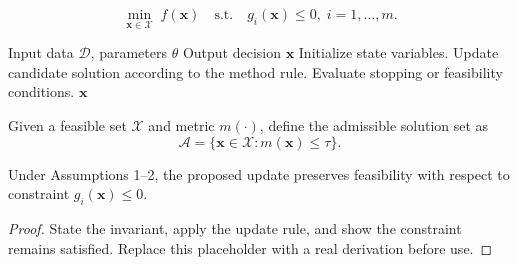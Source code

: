 
\begin{equation}
  \min_{\mathbf{x} \in \mathcal{X}} \; f(\mathbf{x})
  \quad \text{s.t.} \quad
  g_i(\mathbf{x}) \le 0,\; i=1,\ldots,m .
\end{equation}

\begin{algorithm}[t]
\caption{Method Name}
\label{alg:method-name}
\begin{algorithmic}[1]
\Require Input data $\mathcal{D}$, parameters $\theta$
\Ensure Output decision $\mathbf{x}$
\State Initialize state variables.
  \State Update candidate solution according to the method rule.
  \State Evaluate stopping or feasibility conditions.
\EndFor
\State \Return $\mathbf{x}$
\end{algorithmic}
\end{algorithm}

\begin{definition}
Given a feasible set $\mathcal{X}$ and metric $m(\cdot)$, define the admissible solution set as
\[
  \mathcal{A} = \{\mathbf{x} \in \mathcal{X}: m(\mathbf{x}) \le \tau\}.
\]
\end{definition}

\begin{proposition}
Under Assumptions 1--2, the proposed update preserves feasibility with respect to constraint $g_i(\mathbf{x}) \le 0$.
\end{proposition}

\begin{proof}
State the invariant, apply the update rule, and show the constraint remains satisfied. Replace this placeholder with a real derivation before use.
\end{proof}

